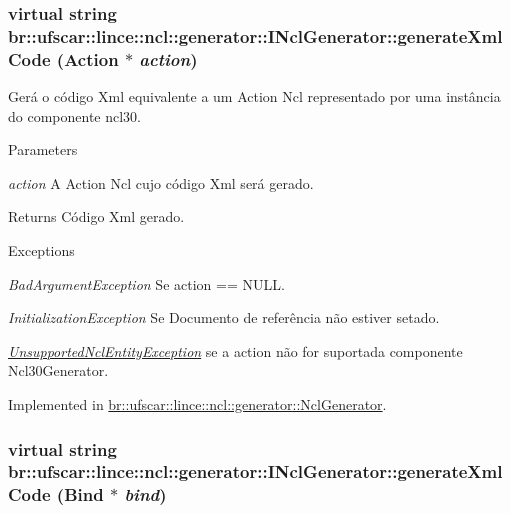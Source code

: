 \hypertarget{classbr_1_1ufscar_1_1lince_1_1ncl_1_1generator_1_1INclGenerator_a6a5fcbb5969d970eef4e5ea8826c84c6}{
\subsubsection[{generateXmlCode}]{\setlength{\rightskip}{0pt plus 5cm}virtual string br::ufscar::lince::ncl::generator::INclGenerator::generateXmlCode (Action $\ast$ {\em action})}}
\label{classbr_1_1ufscar_1_1lince_1_1ncl_1_1generator_1_1INclGenerator_a6a5fcbb5969d970eef4e5ea8826c84c6}


Gerá o código Xml equivalente a um Action Ncl representado por uma instância do componente ncl30. 


\begin{DoxyParams}{Parameters}
\item[{\em action}]A Action Ncl cujo código Xml será gerado. \end{DoxyParams}
\begin{DoxyReturn}{Returns}
Código Xml gerado. 
\end{DoxyReturn}

\begin{DoxyExceptions}{Exceptions}
\item[{\em BadArgumentException}]Se action == NULL. \item[{\em InitializationException}]Se Documento de referência não estiver setado. \item[{\em \hyperlink{classbr_1_1ufscar_1_1lince_1_1ncl_1_1generator_1_1UnsupportedNclEntityException}{UnsupportedNclEntityException}}]se a action não for suportada componente Ncl30Generator. \end{DoxyExceptions}


Implemented in \hyperlink{classbr_1_1ufscar_1_1lince_1_1ncl_1_1generator_1_1NclGenerator_abc3c9219312ca8082cce41d6e1b5fc23}{br::ufscar::lince::ncl::generator::NclGenerator}.

\hypertarget{classbr_1_1ufscar_1_1lince_1_1ncl_1_1generator_1_1INclGenerator_ab868d963b3ca0de3cfc108939731475f}{
\subsubsection[{generateXmlCode}]{\setlength{\rightskip}{0pt plus 5cm}virtual string br::ufscar::lince::ncl::generator::INclGenerator::generateXmlCode (Bind $\ast$ {\em bind})}}
\label{classbr_1_1ufscar_1_1lince_1_1ncl_1_1generator_1_1INclGenerator_ab868d963b3ca0de3cfc108939731475f}



